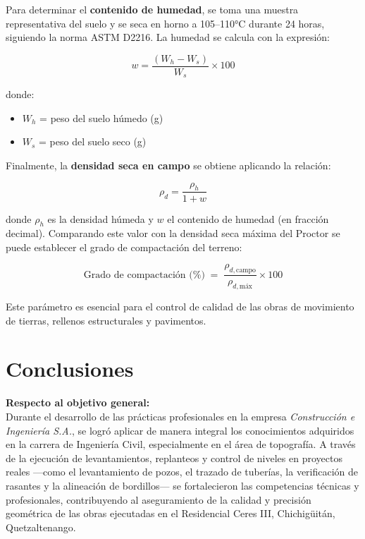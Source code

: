\documentclass[12pt]{article}
\let\oldsection\section
\renewcommand{\section}{\clearpage\oldsection}
\begin{document}
	Para determinar el \textbf{contenido de humedad}, se toma una muestra representativa del suelo y se seca en horno a 105–110°C durante 24 horas, siguiendo la norma ASTM D2216. La humedad se calcula con la expresión:
	
	\[
	w = \frac{(W_h - W_s)}{W_s} \times 100
	\]
	
	donde:
	\begin{itemize}
		\item \( W_h \) = peso del suelo húmedo (g)
		\item \( W_s \) = peso del suelo seco (g)
	\end{itemize}
	
	Finalmente, la \textbf{densidad seca en campo} se obtiene aplicando la relación:
	
	\[
	\rho_d = \frac{\rho_h}{1 + w}
	\]
	
	donde \( \rho_h \) es la densidad húmeda y \( w \) el contenido de humedad (en fracción decimal). Comparando este valor con la densidad seca máxima del Proctor se puede establecer el grado de compactación del terreno:
	

	
	\[
	\text{Grado de compactación (\%)} \;=\;
	\frac{\rho_{d,\text{campo}}}{\rho_{d,\text{máx}}}\times 100
	\]
	
	
	Este parámetro es esencial para el control de calidad de las obras de movimiento de tierras, rellenos estructurales y pavimentos.
	
	
	
	
	
	\section{Conclusiones}
	
	\textbf{Respecto al objetivo general:} \\
	Durante el desarrollo de las prácticas profesionales en la empresa \textit{Construcción e Ingeniería S.A.}, se logró aplicar de manera integral los conocimientos adquiridos en la carrera de Ingeniería Civil, especialmente en el área de topografía. A través de la ejecución de levantamientos, replanteos y control de niveles en proyectos reales —como el levantamiento de pozos, el trazado de tuberías, la verificación de rasantes y la alineación de bordillos— se fortalecieron las competencias técnicas y profesionales, contribuyendo al aseguramiento de la calidad y precisión geométrica de las obras ejecutadas en el Residencial Ceres III, Chichigüitán, Quetzaltenango.
	
\end{document}
